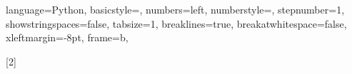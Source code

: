 \usepackage{xparse}

\usepackage{tabto}

\newcommand{\slide}[2][]{
    \begin{frame}
        \frametitle{
            #1
        }

        #2
    \end{frame}
}

\newcommand{\eq}[2]{
    \begin{equation}\label{#1}
        #2
    \end{equation}
}

\newcommand{\R}{\mathbb{R}}
\newcommand{\Rn}[1][n]{\mathbb{R}^#1}


\renewcommand{\listfigurename}{Figures}

\lstset
{
    language=Python,
    basicstyle=\footnotesize,
    numbers=left,
    numberstyle=\tiny,
    stepnumber=1,
    showstringspaces=false,
    tabsize=1,
    breaklines=true,
    breakatwhitespace=false,
    xleftmargin=-8pt,
    frame=b,
}

\newcommand{\codefile}[3]{
    \mdframed[roundcorner=5pt, backgroundcolor=blue!30]
    
    \endmdframed
}
\newcommand{\codefilelines}[5]{
    \mdframed[roundcorner=5pt, backgroundcolor=blue!30]
    
    \endmdframed
}
[2]
{
    \mdframed[roundcorner=5pt, backgroundcolor=blue!30]
}
{
    \endmdframed
}
